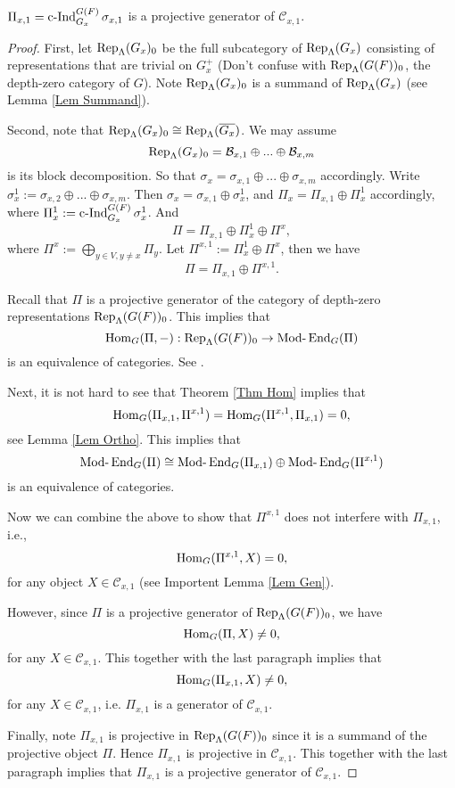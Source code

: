 	\begin{theorem}
		$\Pi_{x,1}=\operatorname{\operatorname{c-Ind}}_{G_x}^{G(F)}\sigma_{x,1}$ is a projective generator of $\mathcal{C}_{x,1}$.
	\end{theorem}
	
	\begin{proof}
		First, let $\operatorname{\operatorname{Rep}}_{\Lambda}(G_x)_0$ be the full subcategory of $\operatorname{\operatorname{Rep}}_{\Lambda}(G_x)$ consisting of representations that are trivial on $G_x^+$ (Don't confuse with $\operatorname{\operatorname{Rep}}_{\Lambda}(G(F))_0$, the depth-zero category of $G$). Note $\operatorname{\operatorname{Rep}}_{\Lambda}(G_x)_0$ is a summand of $\operatorname{\operatorname{Rep}}_{\Lambda}(G_x)$ (see Lemma \ref{Lem Summand}).
		
		Second, note that $\operatorname{\operatorname{Rep}}_{\Lambda}(G_x)_0 \cong \operatorname{\operatorname{Rep}}_{\Lambda}(\overline{G_x})$. We may assume $$\operatorname{\operatorname{Rep}}_{\Lambda}(G_x)_0=\mathcal{B}_{x,1} \oplus ... \oplus \mathcal{B}_{x,m}$$
		is its block decomposition. So that $\sigma_x=\sigma_{x,1}\oplus...\oplus\sigma_{x,m}$ accordingly. Write $\sigma_x^1:=\sigma_{x,2}\oplus...\oplus\sigma_{x,m}$. Then $\sigma_x=\sigma_{x,1} \oplus \sigma_x^1$, and $\Pi_x=\Pi_{x,1} \oplus \Pi_x^1$ accordingly, where $\Pi_x^1:=\operatorname{\operatorname{c-Ind}}_{G_x}^{G(F)}\sigma_x^1$. And
		$$\Pi=\Pi_{x,1}\oplus \Pi_x^1 \oplus \Pi^x,$$
		where $\Pi^x:=\bigoplus_{y \in V, y \neq x}\Pi_y$. Let $\Pi^{x,1}:=\Pi_x^1 \oplus \Pi^x$, then we have
		$$\Pi=\Pi_{x,1} \oplus \Pi^{x,1}.$$
		
		Recall that $\Pi$ is a projective generator of the category of depth-zero representations $\operatorname{\operatorname{Rep}}_{\Lambda}(G(F))_0$. This implies that 
		$$\operatorname{\operatorname{Hom}}_G(\Pi, -): \operatorname{\operatorname{Rep}}_{\Lambda}(G(F))_0 \to \operatorname{Mod-}\operatorname{\operatorname{End}}_G(\Pi)$$
		is an equivalence of categories. See \cite[Lemma 22]{bernsteindraft}.
		
		Next, it is not hard to see that Theorem \ref{Thm Hom} implies that 
		$$\operatorname{\operatorname{Hom}}_G(\Pi_{x,1}, \Pi^{x,1})=\operatorname{\operatorname{Hom}}_G(\Pi^{x,1}, \Pi_{x,1})=0,$$
		see Lemma \ref{Lem Ortho}. This implies that $$\operatorname{Mod-}\operatorname{\operatorname{End}}_G(\Pi) \cong \operatorname{Mod-}\operatorname{\operatorname{End}}_G(\Pi_{x,1}) \oplus \operatorname{Mod-}\operatorname{\operatorname{End}}_G(\Pi^{x,1})$$ is an equivalence of categories.
		
		Now we can combine the above to show that $\Pi^{x,1}$ does not interfere with $\Pi_{x,1}$, i.e.,
		$$\operatorname{\operatorname{Hom}}_G(\Pi^{x,1}, X)=0,$$
		for any object $X \in \mathcal{C}_{x,1}$ (see Importent Lemma \ref{Lem Gen}).
		
		However, since $\Pi$ is a projective generator of $\operatorname{\operatorname{Rep}}_{\Lambda}(G(F))_0$, we have
		$$\operatorname{\operatorname{Hom}}_G(\Pi, X) \neq 0,$$
		for any $X \in \mathcal{C}_{x,1}$. This together with the last paragraph implies that 
		$$\operatorname{\operatorname{Hom}}_G(\Pi_{x,1}, X) \neq 0,$$
		for any $X \in \mathcal{C}_{x,1}$, i.e. $\Pi_{x,1}$ is a generator of $\mathcal{C}_{x,1}$.
		
		Finally, note $\Pi_{x,1}$ is projective in $\operatorname{\operatorname{Rep}}_{\Lambda}(G(F))_0$ since it is a summand of the projective object $\Pi$. Hence $\Pi_{x,1}$ is projective in $\mathcal{C}_{x,1}$. This together with the last paragraph implies that $\Pi_{x,1}$ is a projective generator of $\mathcal{C}_{x,1}$.
	
		
	\end{proof}
	

